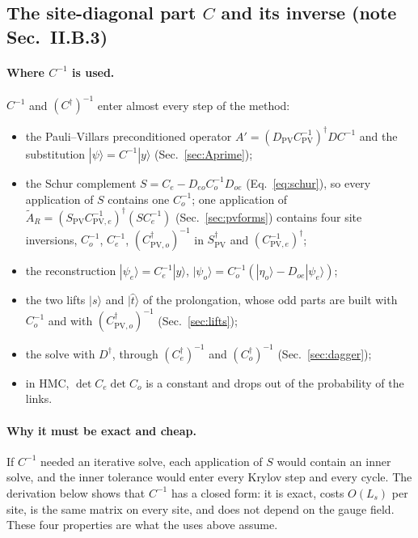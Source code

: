 \documentclass[11pt,a4paper]{article}
\numberwithin{equation}{section}
\newcommand{\dg}{^{\dagger}}
\newcommand{\Dpv}{D_{\mathrm{PV}}}
\newcommand{\Cpv}{C_{\mathrm{PV}}}
\newcommand{\Spv}{S_{\mathrm{PV}}}
\newcommand{\AR}{\tilde A_{R}}
\newcommand{\Ce}{C_{e}}
\newcommand{\Co}{C_{o}}
\newcommand{\Cpve}{C_{\mathrm{PV},e}}
\newcommand{\Cpvo}{C_{\mathrm{PV},o}}
\begin{document}
\subsection{The site-diagonal part $C$ and its inverse (note Sec.~II.B.3)}
\label{sec:Cinv}
\paragraph{Where $C^{-1}$ is used.} $C^{-1}$ and $(C\dg)^{-1}$ enter almost every step of the
method:
\begin{itemize}
\item the Pauli--Villars preconditioned operator $A'=(\Dpv\Cpv^{-1})\dg DC^{-1}$ and the
substitution $|\psi\rangle=C^{-1}|y\rangle$ (Sec.~\ref{sec:Aprime});
\item the Schur complement $S=\Ce-D_{eo}\Co^{-1}D_{oe}$ (Eq.~\eqref{eq:schur}), so every
application of $S$ contains one $\Co^{-1}$; one application of $\AR=(\Spv\Cpve^{-1})\dg(S\Ce^{-1})$
(Sec.~\ref{sec:pvforms}) contains four site inversions, $\Co^{-1}$, $\Ce^{-1}$,
$(\Cpvo\dg)^{-1}$ in $\Spv\dg$ and $(\Cpve^{-1})\dg$;
\item the reconstruction $|\psi_e\rangle=\Ce^{-1}|y\rangle$, $|\psi_o\rangle=\Co^{-1}(|\eta_o\rangle-D_{oe}|\psi_e\rangle)$;
\item the two lifts $|s\rangle$ and $|\hat t\rangle$ of the prolongation, whose odd parts are built with
$\Co^{-1}$ and with $(\Cpvo\dg)^{-1}$ (Sec.~\ref{sec:lifts});
\item the solve with $D\dg$, through $(\Ce\dg)^{-1}$ and $(\Co\dg)^{-1}$ (Sec.~\ref{sec:dagger});
\item in HMC, $\det\Ce\det\Co$ is a constant and drops out of the probability of the links.
\end{itemize}
\paragraph{Why it must be exact and cheap.} If $C^{-1}$ needed an iterative solve, each
application of $S$ would contain an inner solve, and the inner tolerance would enter every
Krylov step and every cycle. The derivation below shows that $C^{-1}$ has a closed form: it is
exact, costs $O(L_s)$ per site, is the same matrix on every site, and does not depend on the
gauge field. These four properties are what the uses above assume.
\end{document}

